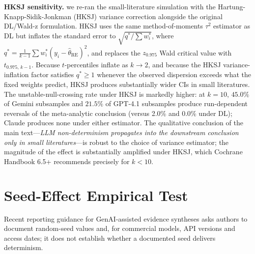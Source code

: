 \documentclass[11pt]{article}
\begin{document}
\noindent \textbf{HKSJ sensitivity.}
we re-ran the small-literature simulation with the Hartung-Knapp-Sidik-Jonkman (HKSJ) variance correction alongside the original DL/Wald-z formulation.
HKSJ uses the same method-of-moments $\tau^2$ estimator as DL but inflates the standard error to $\sqrt{q^{\ast}/\sum w_i^{\ast}}$, where $q^{\ast}{=}\frac{1}{k{-}1}\sum w_i^{\ast}(y_i{-}\hat\theta_{\text{RE}})^2$, and replaces the $z_{0.975}$ Wald critical value with $t_{0.975,\,k{-}1}$.
Because $t$-percentiles inflate as $k{\to}2$, and because the HKSJ variance-inflation factor satisfies $q^{\ast}{\geq}1$ whenever the observed dispersion exceeds what the fixed weights predict, HKSJ produces substantially wider CIs in small literatures.
The unstable-null-crossing rate under HKSJ is markedly higher: at $k{=}10$, $\mathbf{45.0\%}$ of Gemini subsamples and $\mathbf{21.5\%}$ of GPT-4.1 subsamples produce run-dependent reversals of the meta-analytic conclusion (versus 2.0\% and 0.0\% under DL); Claude produces none under either estimator.
The qualitative conclusion of the main text---\emph{LLM non-determinism propagates into the downstream conclusion only in small literatures}---is robust to the choice of variance estimator; the magnitude of the effect is substantially amplified under HKSJ, which Cochrane Handbook 6.5+ recommends precisely for $k{<}10$.

\section{Seed-Effect Empirical Test}
\label{sec:seed_supp}

Recent reporting guidance for GenAI-assisted evidence syntheses asks authors to document random-seed values and, for commercial models, API versions and access dates; it does not establish whether a documented seed delivers determinism.
\end{document}
